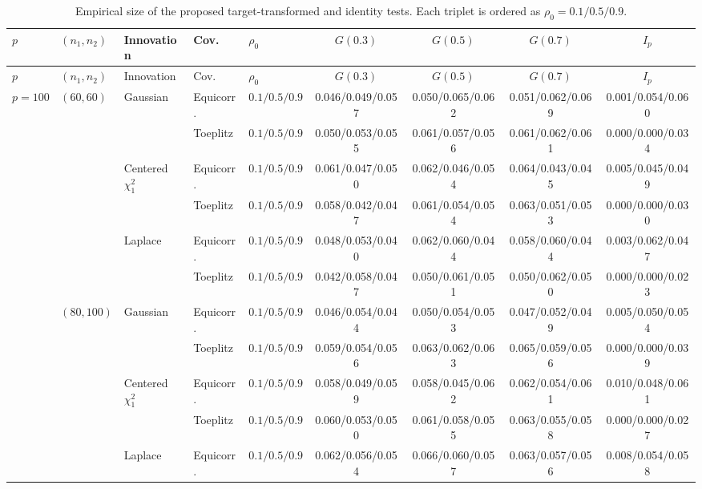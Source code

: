 \begin{landscape}
\begingroup
\small
\setlength{\tabcolsep}{3pt}
\begin{longtable}{@{}lllllcccc@{}}
\caption{Empirical size of the proposed target-transformed and identity tests. Each triplet is ordered as $\rho_0=0.1/0.5/0.9$.}\label{tab:size_main_combined}\\
\toprule
$p$ & $(n_1,n_2)$ & Innovation & Cov. & $\rho_0$ & $G(0.3)$ & $G(0.5)$ & $G(0.7)$ & $I_p$ \\
\midrule
\endfirsthead
\toprule
$p$ & $(n_1,n_2)$ & Innovation & Cov. & $\rho_0$ & $G(0.3)$ & $G(0.5)$ & $G(0.7)$ & $I_p$ \\
\midrule
\endhead
$p=100$ & $(60,60)$ & Gaussian & Equicorr. & $0.1/0.5/0.9$ & 0.046/0.049/0.057 & 0.050/0.065/0.062 & 0.051/0.062/0.069 & 0.001/0.054/0.060 \\
\cmidrule(lr){4-9}
 &  &  & Toeplitz & $0.1/0.5/0.9$ & 0.050/0.053/0.055 & 0.061/0.057/0.056 & 0.061/0.062/0.061 & 0.000/0.000/0.034 \\
\cmidrule(lr){3-9}
 &  & Centered $\chi^2_1$ & Equicorr. & $0.1/0.5/0.9$ & 0.061/0.047/0.050 & 0.062/0.046/0.054 & 0.064/0.043/0.045 & 0.005/0.045/0.049 \\
\cmidrule(lr){4-9}
 &  &  & Toeplitz & $0.1/0.5/0.9$ & 0.058/0.042/0.047 & 0.061/0.054/0.054 & 0.063/0.051/0.053 & 0.000/0.000/0.030 \\
\cmidrule(lr){3-9}
 &  & Laplace & Equicorr. & $0.1/0.5/0.9$ & 0.048/0.053/0.040 & 0.062/0.060/0.044 & 0.058/0.060/0.044 & 0.003/0.062/0.047 \\
\cmidrule(lr){4-9}
 &  &  & Toeplitz & $0.1/0.5/0.9$ & 0.042/0.058/0.047 & 0.050/0.061/0.051 & 0.050/0.062/0.050 & 0.000/0.000/0.023 \\
\addlinespace[2pt]
 & $(80,100)$ & Gaussian & Equicorr. & $0.1/0.5/0.9$ & 0.046/0.054/0.044 & 0.050/0.054/0.053 & 0.047/0.052/0.049 & 0.005/0.050/0.054 \\
\cmidrule(lr){4-9}
 &  &  & Toeplitz & $0.1/0.5/0.9$ & 0.059/0.054/0.056 & 0.063/0.062/0.063 & 0.065/0.059/0.056 & 0.000/0.000/0.039 \\
\cmidrule(lr){3-9}
 &  & Centered $\chi^2_1$ & Equicorr. & $0.1/0.5/0.9$ & 0.058/0.049/0.059 & 0.058/0.045/0.062 & 0.062/0.054/0.061 & 0.010/0.048/0.061 \\
\cmidrule(lr){4-9}
 &  &  & Toeplitz & $0.1/0.5/0.9$ & 0.060/0.053/0.050 & 0.061/0.058/0.055 & 0.063/0.055/0.058 & 0.000/0.000/0.027 \\
\cmidrule(lr){3-9}
 &  & Laplace & Equicorr. & $0.1/0.5/0.9$ & 0.062/0.056/0.054 & 0.066/0.060/0.057 & 0.063/0.057/0.056 & 0.008/0.054/0.058 \\

\end{longtable}
\end{landscape}
